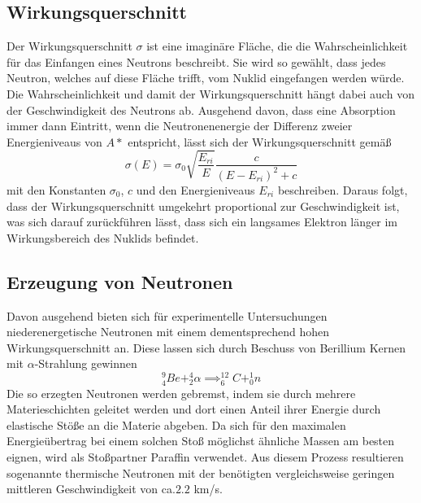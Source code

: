 \documentclass{scrartcl}
\begin{document}
\subsection{Wirkungsquerschnitt}
Der Wirkungsquerschnitt  $\sigma$ ist eine imaginäre Fläche, die die Wahrscheinlichkeit für das Einfangen eines Neutrons beschreibt. Sie wird so gewählt, dass jedes Neutron, welches auf diese Fläche trifft, vom Nuklid eingefangen werden würde.
Die Wahrscheinlichkeit und damit der Wirkungsquerschnitt hängt dabei auch von der Geschwindigkeit des Neutrons ab. Ausgehend davon, dass eine Absorption immer dann Eintritt, wenn die Neutronenenergie der Differenz zweier Energieniveaus von $A*$ entspricht, lässt sich der Wirkungsquerschnitt gemäß
\begin{equation*}
\sigma(E)=\sigma_0 \sqrt{\frac{E_{ri}}{E}}\frac{c}{(E-E_{ri})^2+c}
\end{equation*}
mit den Konstanten $\sigma_0$, $c$ und den Energieniveaus $E_{ri}$ beschreiben. Daraus folgt, dass der Wirkungsquerschnitt umgekehrt proportional zur Geschwindigkeit ist, was sich darauf zurückführen lässt, dass sich ein langsames Elektron länger im Wirkungsbereich des Nuklids befindet.
\subsection{Erzeugung von Neutronen}
Davon ausgehend bieten sich für experimentelle Untersuchungen niederenergetische Neutronen mit einem dementsprechend hohen Wirkungsquerschnitt an. Diese lassen sich durch Beschuss von Berillium Kernen mit $\alpha$-Strahlung gewinnen
\begin{equation*}
^9_4Be + ^4_2\alpha \implies ^{12}_6C + ^1_0n
\end{equation*}
Die so erzegten Neutronen werden gebremst, indem sie durch mehrere Materieschichten geleitet werden und dort einen Anteil ihrer Energie durch elastische Stöße an die Materie abgeben. Da sich für den maximalen Energieübertrag bei einem solchen Stoß möglichst ähnliche Massen am besten eignen, wird als Stoßpartner Paraffin verwendet. Aus diesem Prozess resultieren sogenannte thermische Neutronen mit der benötigten vergleichsweise geringen mittleren Geschwindigkeit von ca.$2.2$ km/s.
\end{document}
